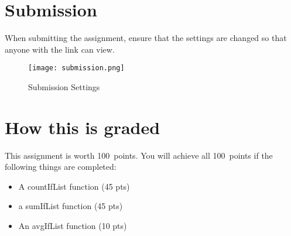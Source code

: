 \documentclass{article}
\newcommand{\AValue}{100}
\begin{document}
\section*{Submission}
When submitting the assignment, ensure that the settings are changed so that anyone with the link can view.
\begin{figure}[H]
  \centering
  \texttt{[image: submission.png]}
  \caption{Submission Settings}
\end{figure}

\section*{How this is graded}
This assignment is worth \AValue \ points. You will achieve all \AValue \   points if the following things are completed:
\begin{itemize}
    \item A countIfList function (45 pts)
    \item a sumIfList function (45 pts)
    \item An avgIfList function (10 pts)
\end{itemize}
\end{document}
